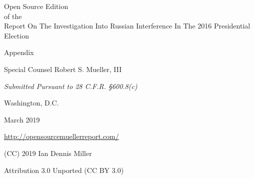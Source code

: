 \thispagestyle{empty}

\begin{center}
\Huge
Open Source Edition \\
of the \\
Report On The Investigation Into Russian Interference In The 2016 Presidential Election

\vspace{10 mm}

\large
Appendix

\vspace{10 mm}

Special Counsel Robert S. Mueller, III

\vspace{10 mm}

\normalsize

\textit{Submitted Pursuant to 28 C.F.R. \S 600.8(c)}

\vspace{20 mm}

Washington, D.C.

\vspace{10 mm}

March 2019

\vspace{10 mm}

\large
\url{http://opensourcemuellerreport.com/}

\vspace{10 mm}

\normalsize
(CC) 2019 Ian Dennis Miller

Attribution 3.0 Unported (CC BY 3.0)

\end{center}

\newpage
